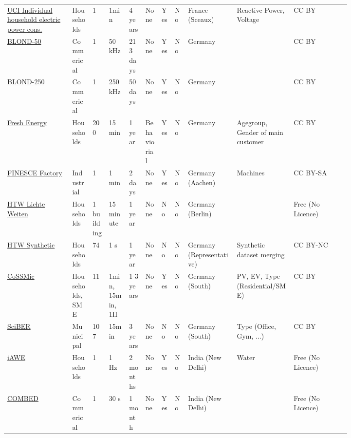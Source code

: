 \begin{sidewaystable*}
{\begin{tabular}{p{0.16\linewidth}p{0.05\linewidth}p{0.04\linewidth}p{0.05\linewidth}p{0.04\linewidth}p{0.04\linewidth}p{0.02\linewidth}p{0.02\linewidth}p{0.12\linewidth}p{0.14\linewidth}p{0.14\linewidth}}
			\href{https://archive.ics.uci.edu/ml/datasets/Individual+household+electric+power+consumption}{UCI Individual household electric power cons.}~\cite{Hebrail2012ihe} & Households & 1     & 1min  & 4 years & None  & Yes   & No    & France (Sceaux) & Reactive Power, Voltage & CC BY \\
			\href{https://mediatum.ub.tum.de/1375836}{BLOND-50}~\cite{Kriechbaumer2017bbo} & Commerical & 1     & 50 kHz & 213 days & None  & Yes   & No    & Germany &       & CC BY \\
			\href{https://mediatum.ub.tum.de/1375836}{BLOND-250}~\cite{Kriechbaumer2017bbo} & Commerical & 1     & 250 kHz & 50 days & None  & Yes   & No    & Germany &       & CC BY \\
			\href{https://zenodo.org/record/3855575\#.YKQgGKgzaUk}{Fresh Energy}~\cite{Beyertt2020fzb} & Households & 200   & 15 min & 1 year & Behaviorial & Yes   & No    & Germany & Agegroup, Gender of main customer & CC BY \\
			\href{https://data.lab.fiware.org/organization/9569f9bd-42bd-414f-b8d9-112553ea9dfb?tags=FINESCE}{FINESCE Factory} 
			& Industrial & 1     & 1 min & 2 days & None  & Yes   & No    & Germany (Aachen) & Machines & CC BY-SA \\
			\href{https://pvspeicher.htw-berlin.de/wp-content/uploads/MFH-Lastprofil_2014_17274_kWh.csv}{HTW Lichte Weiten}~\cite{htw2019ldb}
			& Households & 1 building & 15 minute & 1 year & None  & No    & No    & Germany (Berlin) &       & Free (No Licence) \\
			\href{https://pvspeicher.htw-berlin.de/veroeffentlichungen/daten/lastprofile/}{HTW Synthetic}~\cite{Tjaden2015rel} & Households & 74    & 1 s   & 1 year & None  & No    & No    & Germany (Representative) & Synthetic dataset merging & CC BY-NC \\
			\href{https://data.open-power-system-data.org/household_data/}{CoSSMic} \cite{Open2020dph} & Households, SME & 11    & 1min, 15min, 1H & 1-3 years & None  & Yes   & No    & Germany (South) & PV, EV, Type (Residential/SME) & CC BY \\
			\href{https://im.iism.kit.edu/sciber.php}{SciBER}~\cite{Staudt2018san} & Municipal & 107   & 15min & 3 years & None  & No    & No    & Germany (South) & Type (Office, Gym, ...) & CC BY \\
			\href{https://iawe.github.io/}{iAWE}~\cite{batra2013idi}
			& Households & 1     & 1 Hz  & 2 months & None  & Yes   & No    & India (New Delhi) & Water & Free (No Licence) \\
			\href{https://combed.github.io/}{COMBED}~\cite{Batra2014aco} & Commerical & 1     & 30 s  & 1 month & None  & Yes   & No    & India (New Delhi) &       & Free (No Licence) \\

\end{tabular}}
\end{sidewaystable*}
